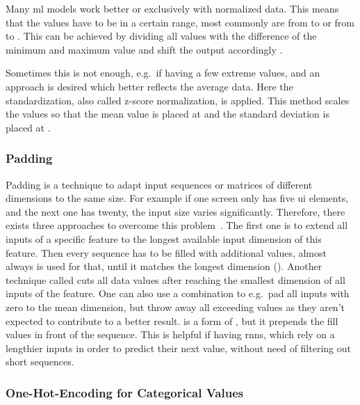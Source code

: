 Many \gls{ml} models work better or exclusively with normalized data.
This means that the values have to be in a certain range, most commonly are from  to  or from  to .
This can be achieved by dividing all values with the difference of the minimum and maximum value and shift the output accordingly \cite{duong2021}.


Sometimes this is not enough, e.g.\ if having a few extreme values, and an approach is desired which better reflects the average data.
Here the standardization, also called z-score normalization, is applied.
This method scales the values so that the mean value is placed at  and the standard deviation is placed at .

\subsubsection{Padding}
\label{subsubsec:padding}

Padding is a technique to adapt input sequences or matrices of different dimensions to the same size.
For example if one screen only has five \gls{ui} elements, and the next one has twenty, the input size varies significantly.
Therefore, there exists three approaches to overcome this problem~\cite{baeldung_padding}.
The first one is to extend all inputs of a specific feature to the longest available input dimension of this feature.
Then every sequence has to be filled with additional values, almost always  is used for that, until it matches the longest dimension ().
Another technique called  cuts all data values after reaching the smallest dimension of all inputs of the feature.
One can also use a combination to e.g.\ pad all inputs with zero to the mean dimension, but throw away all exceeding values as they aren't expected to contribute to a better result.
 is a form of , but it prepends the fill values in front of the sequence.
This is helpful if having \gls{rnn}s, which rely on a lengthier inputs in order to predict their next value, without need of filtering out short sequences.

\subsubsection{One-Hot-Encoding for Categorical Values}
\label{subsubsec:categorical_variables}

